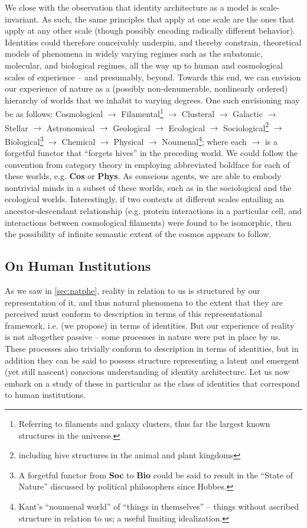 \documentclass[pra,twocolumn,groupedaddress,10pt]{revtex4}
\theoremstyle{definition}
\begin{document}
We close with the observation that identity architecture as a model is scale-invariant. As such, the same principles that apply at one scale are the ones that apply at any other scale (though possibly encoding radically different behavior). Identities could therefore conceivably underpin, and thereby constrain, theoretical models of phenomena in widely varying regimes such as the subatomic, molecular, and biological regimes, all the way up to human and cosmological scales of experience -- and presumably, beyond. Towards this end, we can envision our experience of nature as a (possibly non-denumerable, nonlinearly ordered) hierarchy of worlds that we inhabit to varying degrees. One such envisioning may be as follows: Cosmological $\rightarrow$ Filamental\footnote{Referring to filaments and galaxy clusters, thus far the largest known structures in the universe.} $\rightarrow$ Clusteral $\rightarrow$ Galactic $\rightarrow$ Stellar $\rightarrow$ Astronomical $\rightarrow$ Geological $\rightarrow$ Ecological $\rightarrow$ Sociological\footnote{including hive structures in the animal and plant kingdoms} $\rightarrow$ Biological\footnote{A forgetful functor from \textbf{Soc} to \textbf{Bio} could be said to result in the ``State of Nature'' discussed by political philosophers since Hobbes.} $\rightarrow$ Chemical $\rightarrow$ Physical $\rightarrow$ Noumenal\footnote{Kant's\cite{kant} ``noumenal world'' of ``things in themselves'' -- things without ascribed structure in relation to us; a useful limiting idealization.}; where each $\rightarrow$ is a forgetful functor that ``forgets hives'' in the preceding world. We could follow the convention from category theory in employing abbreviated boldface for each of these worlds, e.g. \textbf{Cos} or \textbf{Phys}. As conscious agents, we are able to embody nontrivial minds in a subset of these worlds, such as in the sociological and the ecological worlds. Interestingly, if two contexts at different scales entailing an ancestor-descendant relationship (e.g. protein interactions in a particular cell, and interactions between cosmological filaments) were found to be isomorphic, then the possibility of infinite semantic extent of the cosmos appears to follow.

\subsection{On Human Institutions} \label{sec:humins}

As we saw in \autoref{sec:natphe}, reality in relation to us is structured by our representation of it, and thus natural phenomena to the extent that they are perceived must conform to description in terms of this representational framework, i.e. (we propose) in terms of identities. But our experience of reality is not altogether passive -- some processes in nature were put in place by us. These processes also trivially conform to description in terms of identities, but in addition they can be said to possess structure representing a latent and emergent (yet still nascent) conscious understanding of identity architecture. Let us now embark on a study of these in particular as the class of identities that correspond to human institutions.
\end{document}
